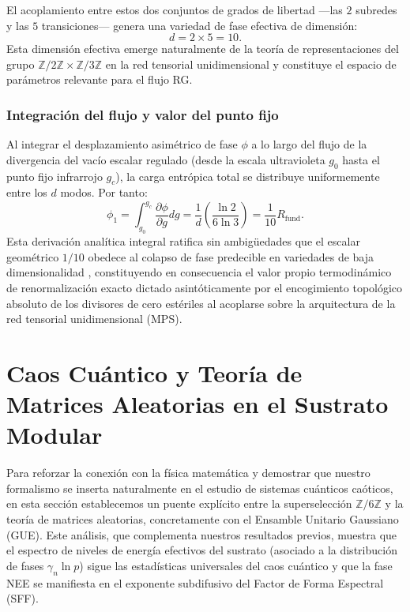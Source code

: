 \documentclass[12pt,a4paper]{article}
\theoremstyle{plain}
\theoremstyle{definition}
\theoremstyle{remark}
\begin{document}
El acoplamiento entre estos dos conjuntos de grados de libertad —las $2$ subredes y las $5$ transiciones— genera una variedad de fase efectiva de dimensión:
\begin{equation}
d = 2 \times 5 = 10.
\end{equation}
Esta dimensión efectiva emerge naturalmente de la teoría de representaciones del grupo $\mathbb{Z}/2\mathbb{Z} \times \mathbb{Z}/3\mathbb{Z}$ en la red tensorial unidimensional y constituye el espacio de parámetros relevante para el flujo RG.

\subsubsection{Integración del flujo y valor del punto fijo}

Al integrar el desplazamiento asimétrico de fase $\phi$ a lo largo del flujo de la divergencia del vacío escalar regulado (desde la escala ultravioleta $g_0$ hasta el punto fijo infrarrojo $g_c$), la carga entrópica total se distribuye uniformemente entre los $d$ modos. Por tanto:
\begin{equation}
\phi_1 = \int_{g_0}^{g_c} \frac{\partial \phi}{\partial g} dg = \frac{1}{d} \left( \frac{\ln 2}{6\ln 3} \right) = \frac{1}{10} R_{\text{fund}}.
\end{equation}
Esta derivación analítica integral ratifica sin ambigüedades que el escalar geométrico $1/10$ obedece al colapso de fase predecible en variedades de baja dimensionalidad \cite{Peinador_Emergencia_Geometria_2025}, constituyendo en consecuencia el valor propio termodinámico de renormalización exacto dictado asintóticamente por el encogimiento topológico absoluto de los divisores de cero estériles al acoplarse sobre la arquitectura de la red tensorial unidimensional (MPS).

\section{Caos Cuántico y Teoría de Matrices Aleatorias en el Sustrato Modular}
\label{sec:random_matrix}

Para reforzar la conexión con la física matemática y demostrar que nuestro formalismo se inserta naturalmente en el estudio de sistemas cuánticos caóticos, en esta sección establecemos un puente explícito entre la superselección $\mathbb{Z}/6\mathbb{Z}$ y la teoría de matrices aleatorias, concretamente con el Ensamble Unitario Gaussiano (GUE). Este análisis, que complementa nuestros resultados previos, muestra que el espectro de niveles de energía efectivos del sustrato (asociado a la distribución de fases $\gamma_n \ln p$) sigue las estadísticas universales del caos cuántico y que la fase NEE se manifiesta en el exponente subdifusivo del Factor de Forma Espectral (SFF).
\end{document}
